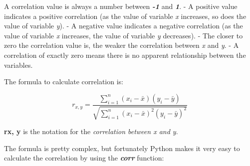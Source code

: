 \documentclass[11pt]{article}
\begin{document}
A correlation value is always a number between \textbf{\emph{-1}} and
\textbf{\emph{1}}. - A positive value indicates a positive correlation
(as the value of variable \emph{x} increases, so does the value of
variable \emph{y}). - A negative value indicates a negative correlation
(as the value of variable \emph{x} increases, the value of variable
\emph{y} decreases). - The closer to zero the correlation value is, the
weaker the correlation between \emph{x} and \emph{y}. - A correlation of
exactly zero means there is no apparent relationship between the
variables.

The formula to calculate correlation is:

\begin{equation}r_{x,y} = \frac{\displaystyle\sum_{i=1}^{n} (x_{i} -\bar{x})(y_{i} -\bar{y})}{\sqrt{\displaystyle\sum_{i=1}^{n} (x_{i} -\bar{x})^{2}(y_{i} -\bar{y})^{2}}}\end{equation}

\textbf{rx, y} is the notation for the \emph{correlation between x and
y}.

The formula is pretty complex, but fortunately Python makes it very easy
to calculate the correlation by using the \textbf{\emph{corr}} function:
\end{document}
